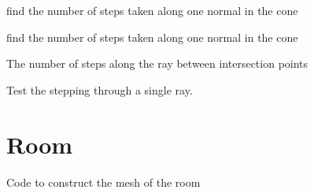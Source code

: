 \documentclass[letterpaper,10pt,english]{sphinxmanual}
\begin{document}

\begin{fulllineitems}
\label{\detokenize{index:Rays.no_cone_steps}}
find the number of steps taken along one normal in the cone

\end{fulllineitems}


\begin{fulllineitems}
\label{\detokenize{index:Rays.no_cones}}
find the number of steps taken along one normal in the cone

\end{fulllineitems}


\begin{fulllineitems}
\label{\detokenize{index:Rays.no_steps}}
The number of steps along the ray between intersection points

\end{fulllineitems}


\begin{fulllineitems}
\label{\detokenize{index:Rays.singleray_test}}
Test the stepping through a single ray.

\end{fulllineitems}



\chapter{Room}
\label{\detokenize{index:module-Room}}\label{\detokenize{index:room}}
Code to construct the mesh of the room
\end{document}
